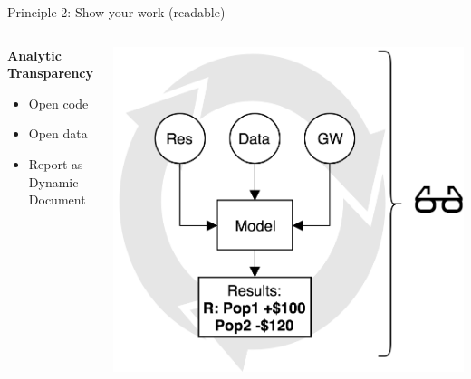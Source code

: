 \documentclass{beamer}
\begin{document}
\begin{frame}{Principle 2: Show your work (readable)}
\begin{columns}
\begin{column}{0.25\textwidth}
   \textbf{Analytic Transparency}
   \begin{itemize}
   \item Open code
   \item Open data
   \item  Report as Dynamic Document    
   \end{itemize}
\end{column}
\begin{column}{0.7\textwidth}  %
    \begin{center}
     \includegraphics[width=1\textwidth]{../Images/a_transp.png}
     \end{center}
\end{column}
\end{columns}
\end{frame}
\end{document}
